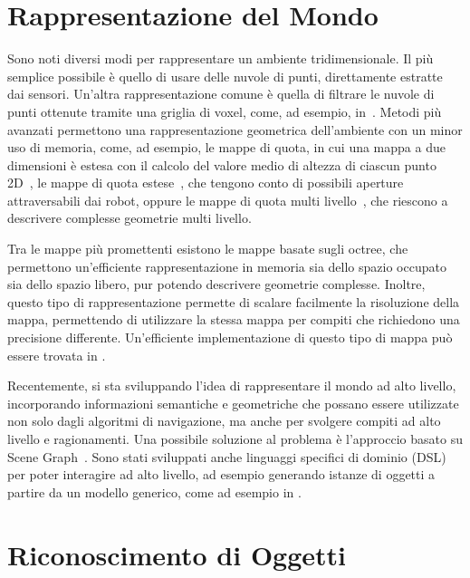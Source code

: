 \section{Rappresentazione del Mondo}

Sono noti diversi modi per rappresentare un ambiente tridimensionale.
Il più semplice possibile è quello di usare delle nuvole di punti, direttamente estratte dai sensori. Un'altra rappresentazione comune è quella di filtrare le nuvole di punti ottenute tramite una griglia di voxel, come, ad esempio, in~\cite{30724}.
Metodi più avanzati permettono una rappresentazione geometrica dell'ambiente con un minor uso di memoria, come, ad esempio, le mappe di quota, in cui una mappa a due dimensioni è estesa con il calcolo del valore medio di altezza di ciascun punto 2D~\cite{herbert1989terrain}, le mappe di quota estese~\cite{pfaff2007efficient}, che tengono conto di possibili aperture attraversabili dai robot, oppure le mappe di quota multi livello~\cite{4058725}, che riescono a descrivere complesse geometrie multi livello.

Tra le mappe più promettenti esistono le mappe basate sugli octree, che permettono un'efficiente rappresentazione in memoria sia dello spazio occupato sia dello spazio libero, pur potendo descrivere geometrie complesse. Inoltre, questo tipo di rappresentazione permette di scalare facilmente la risoluzione della mappa, permettendo di utilizzare la stessa mappa per compiti che richiedono una precisione differente.
Un'efficiente implementazione di questo tipo di mappa può essere trovata in \cite{hornung13auro}.

Recentemente, si sta sviluppando l'idea di rappresentare il mondo ad alto livello, incorporando informazioni semantiche e geometriche che possano essere utilizzate non solo dagli algoritmi di navigazione, ma anche per svolgere compiti ad alto livello e ragionamenti. Una possibile soluzione al problema è l'approccio basato su Scene Graph~\cite{6630614}. Sono stati sviluppati anche linguaggi specifici di dominio (DSL) per poter interagire ad alto livello, ad esempio generando istanze di oggetti a partire da un modello generico, come ad esempio in \cite{blumenthal2014towards}.

\section{Riconoscimento di Oggetti}

